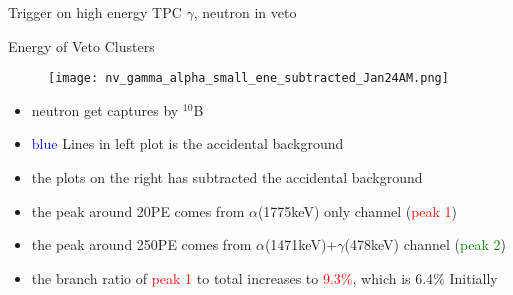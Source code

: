 \documentclass[9pt]{beamer}
\begin{document}
\begin{frame}{Trigger on high energy TPC $\gamma$, neutron in veto}
\end{frame}	

\begin{frame}{Energy of Veto Clusters}
\begin{figure}
\texttt{[image: nv\_gamma\_alpha\_small\_ene\_subtracted\_Jan24AM.png]}
\end{figure}
\begin{itemize}
[bullet]
\item neutron get captures by $^{10}$B
\item \textcolor{blue}{blue} Lines in left plot is the accidental background 
\item the plots on the right has subtracted the accidental background 
\item the peak around 20PE comes from $\alpha$(1775keV) only channel (\textcolor{red}{peak 1})
\item the peak around 250PE comes from $\alpha$(1471keV)+$\gamma$(478keV) channel (\textcolor{green}{peak 2})
\item the branch ratio of \textcolor{red}{peak 1} to total increases to \textcolor{red}{9.3$\%$}, which is 6.4$\%$ Initially 
\end{itemize}
\end{frame}
\end{document}
